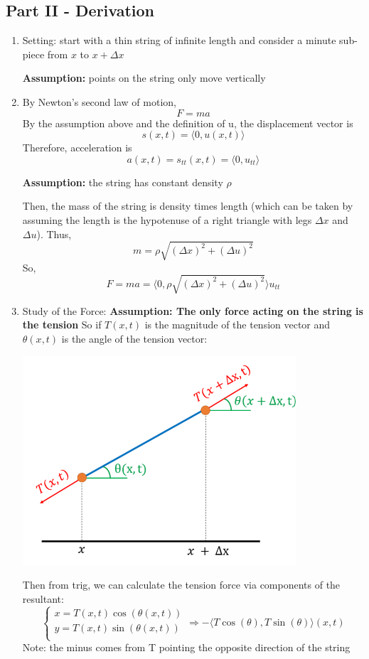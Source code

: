 \documentclass[12pt]{article}
\newcommand{\brak}[1]{\langle #1 \rangle}
\begin{document}
\subsection*{Part II - Derivation}
\begin{enumerate}
    \item Setting: start with a thin string of infinite length and consider a minute sub-piece from $x$ to $x + \Delta x$
    
    \textbf{Assumption:} points on the string only move vertically

    \item By Newton's second law of motion,
    \[F = ma\] 
    By the assumption above and the definition of u, the displacement vector is 
    \[s(x, t) = \brak{0, u(x, t)}\]
    Therefore, acceleration is 
    \[a(x, t) = s_{tt}(x, t) = \brak{0, u_{tt}}\]

    \textbf{Assumption:} the string has constant density $\rho$ 
    
    Then, the mass of the string is density times length (which can be taken by assuming the length is the hypotenuse of a right triangle with legs $\Delta x$ and $\Delta u$). Thus, 
    \[m = \rho \sqrt{(\Delta x)^2 + (\Delta u)^2}\]
    So,
    \[F = ma = \brak{0, \rho \sqrt{(\Delta x)^2 + (\Delta u)^2}}u_{tt}\]

    \item Study of the Force: 
    \textbf{Assumption: The only force acting on the string is the tension}
    So if $T(x, t)$ is the magnitude of the tension vector and $\theta(x, t)$ is the angle of the tension vector:

    \includegraphics[width=0.8\textwidth]{Images/force.png}

    Then from trig, we can calculate the tension force via components of the resultant:
    \[\begin{cases}
        x = T(x, t) \cos(\theta(x, t))\\
        y = T(x, t) \sin(\theta(x, t))\\ 
    \end{cases} \Longrightarrow -\brak{T\cos(\theta), T\sin(\theta)}(x, t)\]
    Note: the minus comes from T pointing the opposite direction of the string


\end{enumerate}
\end{document}
